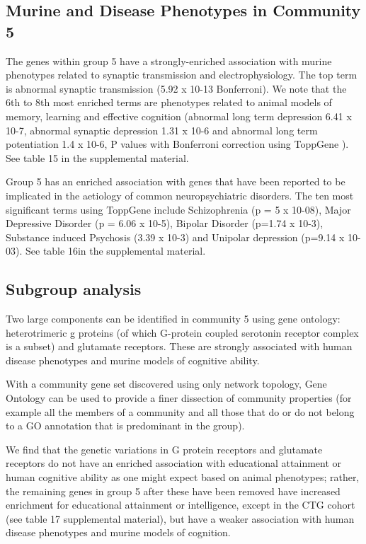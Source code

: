 \subsection{Murine and Disease Phenotypes in Community 5}
The genes within group 5 have a strongly-enriched association with murine phenotypes related to synaptic transmission and electrophysiology. The top term is abnormal synaptic transmission (5.92 x 10-13 Bonferroni). We note that the 6th to 8th most enriched terms are phenotypes related to animal models of memory, learning and effective cognition (abnormal long term depression 6.41 x 10-7, abnormal synaptic depression 1.31 x 10-6 and abnormal long term potentiation 1.4 x 10-6, P values with Bonferroni correction using ToppGene \cite{chen2009toppgene} ). See table 15 in the supplemental material.

Group 5 has an enriched association with genes that have been reported to be implicated in the aetiology of common neuropsychiatric disorders. The ten most significant terms using ToppGene \cite{chen2009toppgene}  include Schizophrenia (p = 5 x 10-08), Major Depressive Disorder (p = 6.06 x 10-5),  Bipolar Disorder (p=1.74 x 10-3), Substance induced Psychosis  (3.39 x 10-3) and Unipolar depression (p=9.14 x 10-03). See table 16in the supplemental material.

\subsection{Subgroup analysis}
Two large components can be identified in community 5 using gene ontology: heterotrimeric g proteins (of which G-protein coupled serotonin receptor complex is a subset) and glutamate receptors. These are strongly associated with human disease phenotypes and murine models of cognitive ability.

With a community gene set discovered using only network topology, Gene Ontology can be used to provide a finer dissection of community properties (for example all the members of a community and all those that do or do not belong to a GO annotation that is predominant in the group).

We find that the genetic variations in G protein receptors and glutamate receptors do not have an enriched association with educational attainment or human cognitive ability as one might expect based on animal phenotypes; rather, the remaining genes in group 5 after these have been removed have increased enrichment for educational attainment or intelligence, except in the CTG cohort (see table 17 supplemental material), but have a weaker association with human disease phenotypes and murine models of cognition. 

